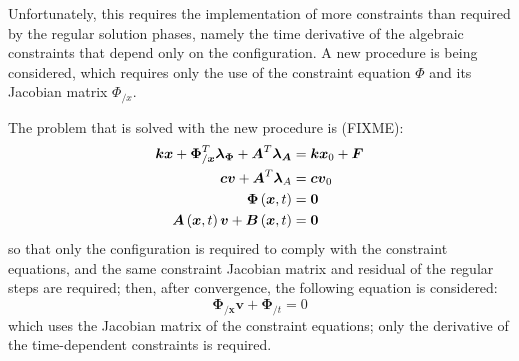 \documentclass[10pt,dvips,fleqn]{report}
\newcommand{\T}[1]{\boldsymbol{#1}}
\begin{document}
Unfortunately, this requires the implementation of more constraints
than required by the regular solution phases, namely the time derivative
of the algebraic constraints that depend only on the configuration.
A new procedure is being considered, which requires only the use 
of the constraint equation $\Phi$ and its Jacobian matrix $\Phi_{/x}$.

The problem that is solved with the new procedure is (FIXME):
\begin{align}
	\T{k} \T{x} + \T{\Phi}_{/\T{x}}^T \T{\lambda}_{\T{\Phi}} + \T{A}^T \T{\lambda}_{\T{A}} 
		& = \T{k} \T{x}_0 + \T{F} \\
	\T{c} \T{v} + \T{A}^T \T{\lambda}_{A} & = \T{c} \T{v}_0 \\
	\T{\Phi}\plbr{\T{x}, t} & = \T{0} \\
	\T{A}\plbr{\T{x}, t} \T{v} + \T{B}\plbr{\T{x}, t} & = \T{0}
\end{align}
so that only the configuration is required to comply 
with the constraint equations, and the same constraint 
Jacobian matrix and residual of the regular steps are required;
then, after convergence, the following equation is considered:
\begin{equation}
	\T{\Phi}_{/\T{x}} \T{v} + \T{\Phi}_{/t} = 0
\end{equation}
which uses the Jacobian matrix of the constraint equations; 
only the derivative of the time-dependent constraints is required.
\end{document}
